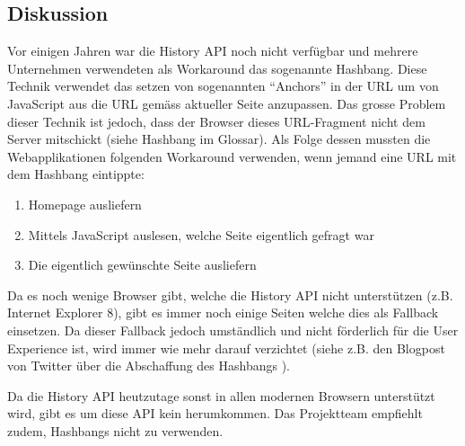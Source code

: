 \subsection*{Diskussion}
Vor einigen Jahren war die History API noch nicht verfügbar und mehrere Unternehmen verwendeten als Workaround das sogenannte \gls{Hashbang}. Diese Technik verwendet das setzen von sogenannten ``Anchors'' in der URL um von JavaScript aus die \gls{URL} gemäss aktueller Seite anzupassen. Das grosse Problem dieser Technik ist jedoch, dass der Browser dieses \gls{URL}-Fragment nicht dem Server mitschickt (siehe \gls{Hashbang} im Glossar).
Als Folge dessen mussten die Webapplikationen folgenden Workaround verwenden, wenn jemand eine URL mit dem Hashbang eintippte:
\begin{enumerate}
	\item Homepage ausliefern
	\item Mittels JavaScript auslesen, welche Seite eigentlich gefragt war
	\item Die eigentlich gewünschte Seite ausliefern
\end{enumerate}

Da es noch wenige Browser gibt, welche die History API nicht unterstützen (z.B. Internet Explorer 8), gibt es immer noch einige Seiten welche dies als Fallback einsetzen. Da dieser Fallback jedoch umständlich und nicht förderlich für die User Experience ist, wird immer wie mehr darauf verzichtet (siehe z.B. den Blogpost von Twitter über die Abschaffung des Hashbangs \cite{twitterAbandonsHashbangs}).

Da die History API heutzutage sonst in allen modernen Browsern unterstützt wird, gibt es um diese API kein herumkommen. Das Projektteam
empfiehlt zudem, Hashbangs nicht zu verwenden.